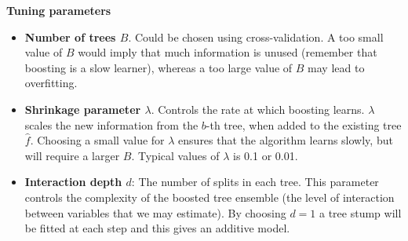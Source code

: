 \documentclass[10pt,ignorenonframetext,]{beamer}
\begin{document}
\begin{frame}

\textbf{Tuning parameters}

\begin{itemize}
\item
  \textbf{Number of trees \(B\)}. Could be chosen using
  cross-validation. A too small value of \(B\) would imply that much
  information is unused (remember that boosting is a slow learner),
  whereas a too large value of \(B\) may lead to overfitting.
\item
  \textbf{Shrinkage parameter \(\lambda\)}. Controls the rate at which
  boosting learns. \(\lambda\) scales the new information from the
  \(b\)-th tree, when added to the existing tree \(\hat{f}\). Choosing a
  small value for \(\lambda\) ensures that the algorithm learns slowly,
  but will require a larger \(B\). Typical values of \(\lambda\) is 0.1
  or 0.01.
\item
  \textbf{Interaction depth \(d\)}: The number of splits in each tree.
  This parameter controls the complexity of the boosted tree ensemble
  (the level of interaction between variables that we may estimate). By
  choosing \(d=1\) a tree stump will be fitted at each step and this
  gives an additive model.
\end{itemize}

\end{frame}
\end{document}
